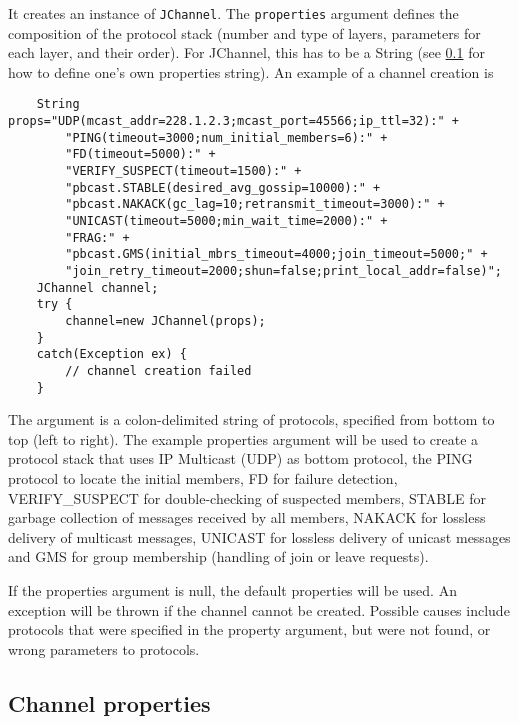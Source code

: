     It creates an instance of {\tt JChannel}. The {\tt properties} argument defines
    the composition of the protocol stack (number and type of layers, parameters for
    each layer, and their order). For JChannel, this has to be a String (see
    \ref{ChannelProperties} for how to define one's own properties string). An
    example of a channel creation is
    
    \begin{small}
    \begin{verbatim}
    String props="UDP(mcast_addr=228.1.2.3;mcast_port=45566;ip_ttl=32):" +
        "PING(timeout=3000;num_initial_members=6):" +
        "FD(timeout=5000):" +
        "VERIFY_SUSPECT(timeout=1500):" +
        "pbcast.STABLE(desired_avg_gossip=10000):" +
        "pbcast.NAKACK(gc_lag=10;retransmit_timeout=3000):" +
        "UNICAST(timeout=5000;min_wait_time=2000):" +
        "FRAG:" +
        "pbcast.GMS(initial_mbrs_timeout=4000;join_timeout=5000;" +
        "join_retry_timeout=2000;shun=false;print_local_addr=false)";
    JChannel channel;
    try {
        channel=new JChannel(props);
    }
    catch(Exception ex) {
        // channel creation failed
    }
    \end{verbatim}
    \end{small}

    The argument is a colon-delimited string of protocols, specified from bottom to
    top (left to right). The example properties argument will be used to create a
    protocol stack that uses IP Multicast (UDP) as bottom protocol, the PING protocol
    to locate the initial members, FD for failure detection, VERIFY\_SUSPECT for
    double-checking of suspected members, STABLE for garbage collection of messages
    received by all members, NAKACK for lossless delivery of multicast messages,
    UNICAST for lossless delivery of unicast messages and GMS for group membership
    (handling of join or leave requests).

    If the properties argument is null, the default properties will be used. An
    exception will be thrown if the channel cannot be created. Possible causes
    include protocols that were specified in the property argument, but were not
    found, or wrong parameters to protocols.



    \subsection{Channel properties} \label{ChannelProperties}

